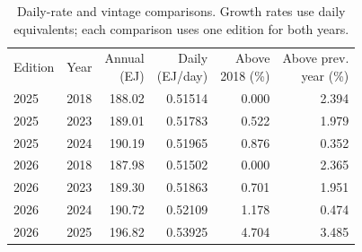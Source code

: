 \documentclass[reprint,aps,pra,longbibliography,floatfix]{revtex4-2}
\begin{document}
\begin{table}[tb]\centering\small\setlength{\tabcolsep}{2.8pt}
\caption{Daily-rate and vintage comparisons. Growth rates use daily equivalents; each comparison uses one edition for both years.}\label{tab:vintages}
\begin{ruledtabular}\begin{tabular}{llrrrr}
Edition & Year & \shortstack{Annual\\(EJ)} & \shortstack{Daily\\(EJ/day)} & \shortstack{Above\\2018 (\%)} & \shortstack{Above prev.\\year (\%)}\\
2025 & 2018 & 188.02 & 0.51514 & 0.000 & 2.394 \\
2025 & 2023 & 189.01 & 0.51783 & 0.522 & 1.979 \\
2025 & 2024 & 190.19 & 0.51965 & 0.876 & 0.352 \\
2026 & 2018 & 187.98 & 0.51502 & 0.000 & 2.365 \\
2026 & 2023 & 189.30 & 0.51863 & 0.701 & 1.951 \\
2026 & 2024 & 190.72 & 0.52109 & 1.178 & 0.474 \\
2026 & 2025 & 196.82 & 0.53925 & 4.704 & 3.485 \\
\end{tabular}\end{ruledtabular}\end{table}
\end{document}
